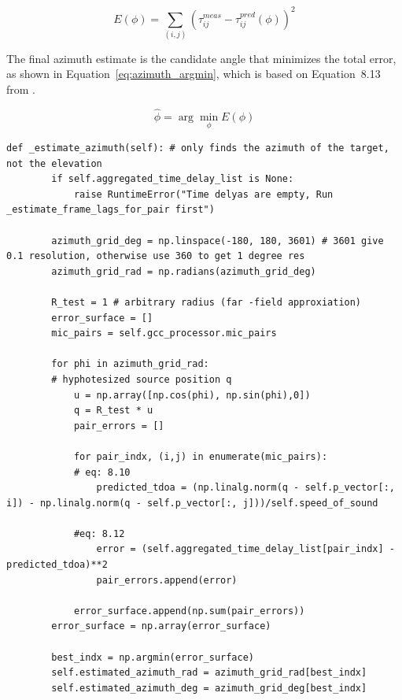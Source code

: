     \begin{equation}
        E(\phi) =
        \sum_{(i,j)}
        \left(\tau_{ij}^{meas} - \tau_{ij}^{pred}(\phi)\right)^2
        \label{eq:azimuth_error}
    \end{equation}

    The final azimuth estimate is the candidate angle that minimizes the total error, as shown in Equation~\ref{eq:azimuth_argmin}, which is based on Equation~8.13 from \cite{brandstein2001microphonearrays}.

    \begin{equation}
        \hat{\phi} = \arg\min_{\phi} E(\phi)
        \label{eq:azimuth_argmin}
    \end{equation}
    
    
    \newpage
    \begin{lstlisting}[style=pythonstyle, caption={Function used to estimate the azimuth of the sound source.}, label={lst:estimated_azimuth}]
     def _estimate_azimuth(self): # only finds the azimuth of the target, not the elevation
        if self.aggregated_time_delay_list is None:
            raise RuntimeError("Time delyas are empty, Run _estimate_frame_lags_for_pair first")

        azimuth_grid_deg = np.linspace(-180, 180, 3601) # 3601 give 0.1 resolution, otherwise use 360 to get 1 degree res
        azimuth_grid_rad = np.radians(azimuth_grid_deg)

        R_test = 1 # arbitrary radius (far -field approxiation)
        error_surface = []
        mic_pairs = self.gcc_processor.mic_pairs

        for phi in azimuth_grid_rad:
        # hyphotesized source position q 
            u = np.array([np.cos(phi), np.sin(phi),0])
            q = R_test * u
            pair_errors = []

            for pair_indx, (i,j) in enumerate(mic_pairs):
            # eq: 8.10
                predicted_tdoa = (np.linalg.norm(q - self.p_vector[:, i]) - np.linalg.norm(q - self.p_vector[:, j]))/self.speed_of_sound

            #eq: 8.12 
                error = (self.aggregated_time_delay_list[pair_indx] - predicted_tdoa)**2
                pair_errors.append(error)

            error_surface.append(np.sum(pair_errors))
        error_surface = np.array(error_surface)

        best_indx = np.argmin(error_surface)
        self.estimated_azimuth_rad = azimuth_grid_rad[best_indx]
        self.estimated_azimuth_deg = azimuth_grid_deg[best_indx]
    \end{lstlisting}
\newpage
